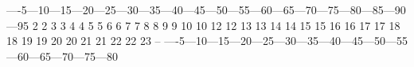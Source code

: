 \begin{fortran77}
----5---10---15---20---25---30---35---40---45---50---55---60---65---70---75---80---85---90---95
 2                                                                             2
 3                                                                             3
 4                                                                             4
 5                                                                             5
 6                                                                             6
 7                                                                             7
 8                                                                             8
 9                                                                             9
10                                                                            10
12                                                                            12
13                                                                            13
14                                                                            14
15                                                                            15
16                                                                            16
17                                                                            17
18                                                                            18
19                                                                            19
20                                                                            20
21                                                                            21
22                                                                            22
23                                                                            --
----5---10---15---20---25---30---35---40---45---50---55---60---65---70---75---80
\end{fortran77}
